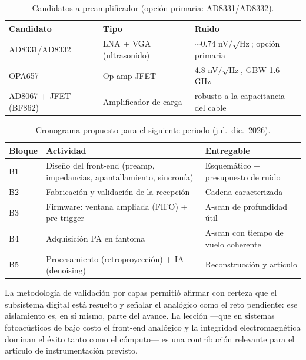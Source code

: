 \documentclass[12pt,letterpaper]{article}
\begin{document}
\begin{table}[htbp]
\centering\small
\begin{tabular}{lll}
\toprule
\textbf{Candidato} & \textbf{Tipo} & \textbf{Ruido} \\
\midrule
AD8331/AD8332 & LNA + VGA (ultrasonido) & $\sim$0.74 nV/$\sqrt{\text{Hz}}$; opción primaria \\
OPA657 & Op-amp JFET & 4.8 nV/$\sqrt{\text{Hz}}$, GBW 1.6 GHz \\
AD8067 + JFET (BF862) & Amplificador de carga & robusto a la capacitancia del cable \\
\bottomrule
\end{tabular}
\caption{Candidatos a preamplificador (opción primaria: AD8331/AD8332).}
\label{tab:preamp}
\end{table}

\begin{table}[htbp]
\centering\small
\begin{tabular}{|p{}|p{}|p{}|}
\hline
\textbf{Bloque} & \textbf{Actividad} & \textbf{Entregable} \\ \hline
B1 & Diseño del front-end (preamp, impedancias, apantallamiento, sincronía) &
Esquemático + presupuesto de ruido \\ \hline
B2 & Fabricación y validación de la recepción & Cadena caracterizada \\ \hline
B3 & Firmware: ventana ampliada (FIFO) + pre-trigger & A-scan de profundidad útil \\ \hline
B4 & Adquisición PA en fantoma & A-scan con tiempo de vuelo coherente \\ \hline
B5 & Procesamiento (retroproyección) + IA (denoising) & Reconstrucción y artículo \\ \hline
\end{tabular}
\caption{Cronograma propuesto para el siguiente periodo (jul.--dic.\ 2026).}
\label{tab:cronograma_rev}
\end{table}

La metodología de validación por capas permitió afirmar con certeza que el subsistema
digital está resuelto y señalar el analógico como el reto pendiente: ese aislamiento es,
en sí mismo, parte del avance. La lección —que en sistemas fotoacústicos de bajo costo
el front-end analógico y la integridad electromagnética dominan el éxito tanto como el
cómputo— es una contribución relevante para el artículo de instrumentación previsto.

\printbibliography
\end{document}
